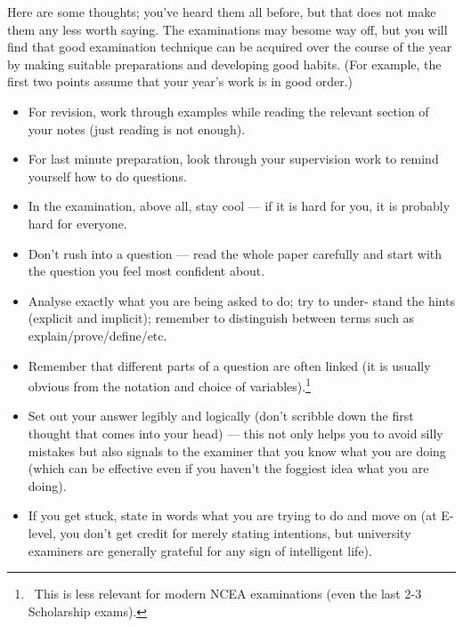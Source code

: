 \documentclass{exam}
\theoremstyle{definition}
\begin{document}
Here are some thoughts; you've heard them all before, but that does not make them any less worth saying. The examinations may besome way off, but you will find that good examination technique can be acquired over the course of the year by making suitable preparations and developing good habits. (For example, the first two points
assume that your year's work is in good order.)

\begin{itemize}
  \item For revision, work through examples while reading the relevant section of your notes (just reading is not enough).

  \item For last minute preparation, look through your supervision work to remind yourself how to do questions.

  \item In the examination, above all, stay cool --- if it is hard for you, it is probably hard for everyone.

  \item Don't rush into a question --- read the whole paper carefully and
        start with the question you feel most confident about.

  \item Analyse exactly what you are being asked to do; try to under-
        stand the hints (explicit and implicit); remember to distinguish
        between terms such as explain/prove/define/etc.

  \item Remember that different parts of a question are often linked (it
        is usually obvious from the notation and choice of variables).\footnote{~This is
        less relevant for modern NCEA examinations (even the last 2-3 Scholarship exams).}

  \item Set out your answer legibly and logically (don't scribble down
        the first thought that comes into your head) --- this not only
        helps you to avoid silly mistakes but also signals to the examiner
        that you know what you are doing (which can be effective even
        if you haven't the foggiest idea what you are doing).

  \item If you get stuck, state in words what you are trying to do and
        move on (at E-level, you don't get credit for merely stating
        intentions, but university examiners are generally grateful for
        any sign of intelligent life).
\end{itemize}
\end{document}
